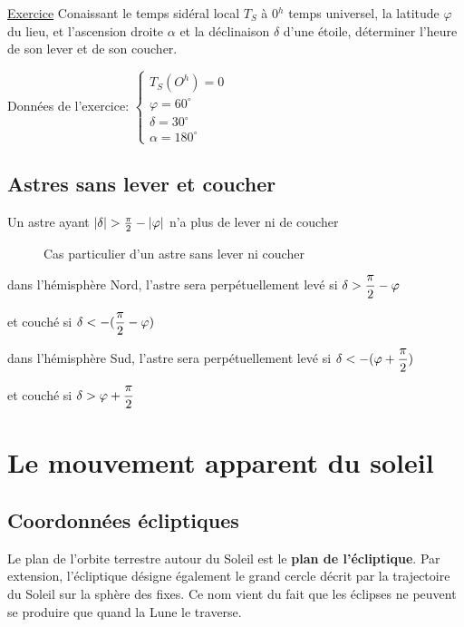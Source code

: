 \documentclass[12pt]{report}
\begin{document}
\underline{Exercice} 
Conaissant le temps sidéral local $T_S$ à 0$^h$ temps universel, la latitude $\varphi$ du lieu, et l'ascension droite $\alpha$ et la déclinaison $\delta$ d'une étoile, déterminer l'heure de son lever et de son coucher. 

Données de l'exercice:
\bigskip
$
\left\{
\begin{array}{lll}
T_S (O^h) = 0\\
\varphi = 60^\circ\\
\delta = 30^\circ\\
\alpha = 180^\circ
\end{array}
\right.
$

\newpage
\section{Astres sans lever et coucher \label{lever}}

Un astre ayant $|\delta| > {\pi\over 2} - |\varphi|$ n'a plus de lever ni de coucher

\begin{figure}[ht]
\begin{center}
\end{center}
\caption{Cas particulier d'un astre sans lever ni coucher}
\label{fig:20}
\end{figure}



dans l'hémisphère Nord, l'astre sera perpétuellement levé si $\delta > \displaystyle {\pi\over 2} - \varphi$ 

\medskip

\hspace*{85mm} et couché si $\delta < - \displaystyle ({\pi\over 2}-\varphi)$


\bigskip

dans l'hémisphère Sud, l'astre sera perpétuellement levé si $\delta < - \displaystyle (\varphi + {\pi\over 2})$ 

\medskip

\hspace*{83mm} et couché si $\delta >  \displaystyle \varphi + {\pi\over 2}$


\chapter{Le mouvement apparent du soleil}


\section{{Coordonnées écliptiques}} 
Le plan de l'orbite terrestre autour du Soleil est le \textbf{plan de l'écliptique}. Par extension, l'écliptique désigne également le grand cercle décrit par la trajectoire du Soleil sur la sphère des fixes.  Ce nom vient du fait que les éclipses ne peuvent se produire que quand la Lune le traverse.
\end{document}
